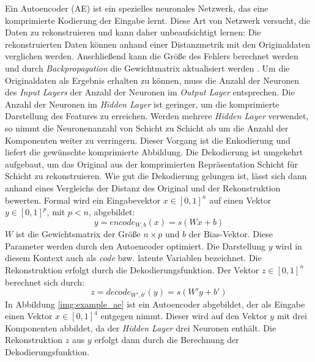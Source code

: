 Ein Autoencoder (AE) ist ein spezielles neuronales Netzwerk, das eine komprimierte Kodierung der Eingabe lernt. Diese Art von Netzwerk versucht, die Daten zu rekonstruieren und kann daher unbeaufsichtigt lernen: Die rekonstruierten Daten können anhand einer Distanzmetrik mit den Originaldaten verglichen werden. Anschließend kann die Größe des Fehlers berechnet werden und durch \textit{Backpropagation} die Gewichtmatrix aktualisiert werden \cite{ssn1997}.
Um die Originaldaten als Ergebnis erhalten zu können, muss die Anzahl der Neuronen des \textit{Input Layers} der Anzahl der Neuronen im \textit{Output Layer} entsprechen. Die Anzahl der Neuronen im \textit{Hidden Layer} ist geringer, um die komprimierte Darstellung des Features zu erreichen. Werden mehrere \textit{Hidden Layer} verwendet, so nimmt die Neuronenanzahl von Schicht zu Schicht ab um die Anzahl der Komponenten weiter zu verringern. Dieser Vorgang ist die Enkodierung und liefert die gewünschte komprimierte Abbildung. Die Dekodierung ist umgekehrt aufgebaut, um das Original aus der komprimierten Repräsentation Schicht für Schicht zu rekonstruieren. Wie gut die Dekodierung gelungen ist, lässt sich dann anhand eines Vergleichs der Distanz des Original und der Rekonstruktion bewerten.\newline
Formal wird ein Eingabevektor $x \in [0,1]^n$ auf einen Vektor $y \in [0,1]^p$, mit $p < n$, abgebildet: 
$$y = encode_{W,b}(x) = s(Wx + b)$$
$W$ ist die Gewichtsmatrix der Größe $n \times p$ und $b$ der Bias-Vektor. Diese Parameter werden durch den Autoencoder optimiert. Die Darstellung $y$ wird in diesem Kontext auch als \textit{code} bzw. latente Variablen bezeichnet. Die Rekonstruktion erfolgt durch die Dekodierungsfunktion. Der Vektor $z \in [0, 1]^n$ berechnet sich durch: 
$$z = decode_{W', b'}(y) = s(W'y + b')$$
In Abbildung \ref{img:example_ae} ist ein Autoencoder abgebildet, der als Eingabe einen Vektor $x \in [0,1]^4$ entgegen nimmt. Dieser wird auf den Vektor $y$ mit drei Komponenten abbildet, da der \textit{Hidden Layer} drei Neuronen enthält. Die Rekonstruktion $z$ aus $y$ erfolgt dann durch die Berechnung der Dekodierungsfunktion.

